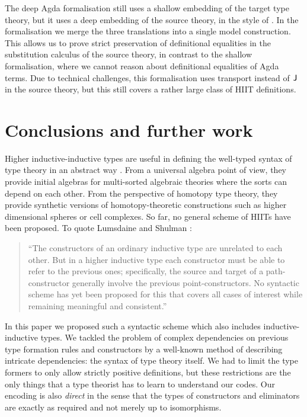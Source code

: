 \documentclass[a4paper,UKenglish]{lipics-v2018}
\newcommand{\1}{\mathsf{1}} \renewcommand{\Pr}{\mathsf{Pr}}
\begin{document}
The deep Agda formalisation still uses a shallow embedding of the
target type theory, but it uses a deep embedding of the source theory,
in the style of \cite{ttintt}. In the formalisation we merge the three
translations into a single model construction. This allows us to prove
strict preservation of definitional equalities in the substitution
calculus of the source theory, in contrast to the shallow
formalisation, where we cannot reason about definitional equalities of
Agda terms. Due to technical challenges, this formalisation uses
transport instead of $\mathsf{J}$ in the source theory, but this still covers
a rather large class of HIIT definitions.


\section{Conclusions and further work}
\label{sec:summary}

Higher inductive-inductive types are useful in defining the well-typed
syntax of type theory in an abstract way \cite{ttintt}. From a
universal algebra point of view, they provide initial algebras for
multi-sorted algebraic theories where the sorts can depend on each
other. From the perspective of homotopy type theory, they provide
synthetic versions of homotopy-theoretic constructions such as higher
dimensional spheres or cell complexes. So far, no general scheme of
HIITs have been proposed. To quote Lumsdaine and Shulman
\cite{lumsdaineShulman}:
\begin{quotation}
``The constructors of an ordinary inductive type are unrelated to each
other.  But in a higher inductive type each constructor must be able
to refer to the previous ones; specifically, the source and target of
a path-constructor generally involve the previous
point-constructors. No syntactic scheme has yet been proposed for this
that covers all cases of interest while remaining meaningful and
consistent.''
\end{quotation}
In this paper we proposed such a syntactic scheme which also includes
inductive-inductive types. We tackled the problem of complex
dependencies on previous type formation rules and constructors by a
well-known method of describing intricate dependencies: the syntax of
type theory itself. We had to limit the type formers to only allow
strictly positive definitions, but these restrictions are the only
things that a type theorist has to learn to understand our codes. Our
encoding is also \emph{direct} in the sense that the types of
constructors and eliminators are exactly as required and not merely up
to isomorphisms.
\end{document}
